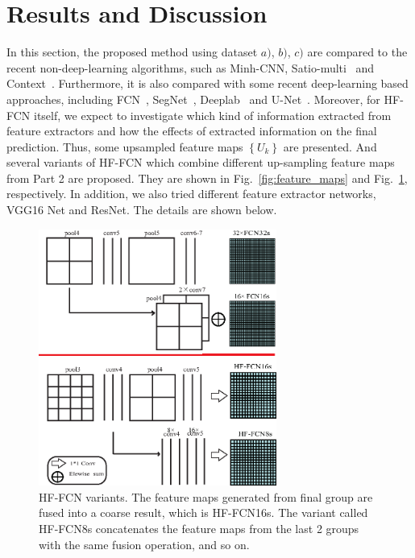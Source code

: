 \section{Results and Discussion}
\label{Sec:Res}

In this section, the proposed method using dataset ${a)}$, ${b)}$, ${c)}$ are compared to the recent non-deep-learning algorithms, such as Minh-CNN\cite{IEEEexample:mnih2013machine}, Satio-multi~\cite{IEEEexample:saito2016multiple} and Context~\cite{IEEEexample:audebert2017deep}.
%
Furthermore, it is also compared with some recent deep-learning based approaches, including FCN~\cite{IEEEexample:Long_2015_CVPR}, SegNet~\cite{IEEEexample:badrinarayanan2017segnet}, Deeplab~\cite{IEEEexample:chen2016deeplab} and U-Net~\cite{IEEEexample:ronneberger2015u}.
Moreover, for HF-FCN itself, we expect to investigate which kind of information extracted from feature extractors and how the effects of extracted information on the final prediction.
Thus, some upsampled feature maps ${\left\{U_k\right\}}$ are presented.
And several variants of HF-FCN which combine different up-sampling feature maps from Part 2 are proposed.
They are shown in Fig.~\ref{fig:feature_maps} and Fig.~\ref{fig:Variants}, respectively.
In addition, we also tried different feature extractor networks, VGG16 Net and ResNet. The details are shown below.

\begin{figure}[t]
\begin{center}
\includegraphics[width=7.8cm]{Figures/vairants.eps}
\caption{HF-FCN variants. The feature maps generated from final group are fused into a coarse result, which is HF-FCN16s. The variant called HF-FCN8s concatenates the feature maps from the last 2 groups with the same fusion operation, and so on.}
\label{fig:Variants}
\end{center}
\end{figure}


